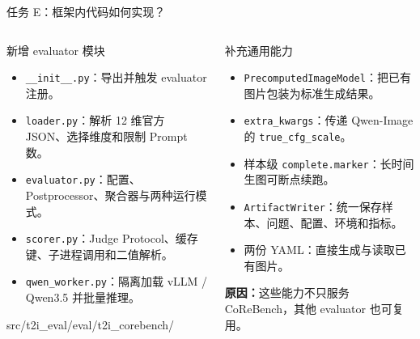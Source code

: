 \documentclass[aspectratio=169,10pt]{beamer}
\begin{document}
\begin{frame}{任务 E：框架内代码如何实现？}
  \begin{columns}[T,onlytextwidth]
      \begin{block}{新增 evaluator 模块}
        \begin{minipage}[c][5.0cm][c]{\linewidth}
          \begin{itemize}\scriptsize
            \item \texttt{\_\_init\_\_.py}：导出并触发 evaluator 注册。
            \item \texttt{loader.py}：解析 12 维官方 JSON、选择维度和限制 Prompt 数。
            \item \texttt{evaluator.py}：配置、Postprocessor、聚合器与两种运行模式。
            \item \texttt{scorer.py}：Judge Protocol、缓存键、子进程调用和二值解析。
            \item \texttt{qwen\_worker.py}：隔离加载 vLLM / Qwen3.5 并批量推理。
          \end{itemize}
          \vspace{0.3em}
          \scriptsize\ttfamily src/t2i\_eval/eval/t2i\_corebench/
        \end{minipage}
      \end{block}
      \begin{block}{补充通用能力}
        \begin{minipage}[c][5.0cm][c]{\linewidth}
          \begin{itemize}\scriptsize
            \item \texttt{PrecomputedImageModel}：把已有图片包装为标准生成结果。
            \item \texttt{extra\_kwargs}：传递 Qwen-Image 的 \texttt{true\_cfg\_scale}。
            \item 样本级 \texttt{complete.marker}：长时间生图可断点续跑。
            \item \texttt{ArtifactWriter}：统一保存样本、问题、配置、环境和指标。
            \item 两份 YAML：直接生成与读取已有图片。
          \end{itemize}
          \vspace{0.3em}
          \scriptsize\textbf{原因：}这些能力不只服务 CoReBench，其他 evaluator 也可复用。
        \end{minipage}
      \end{block}

\end{columns}
\end{frame}
\end{document}
